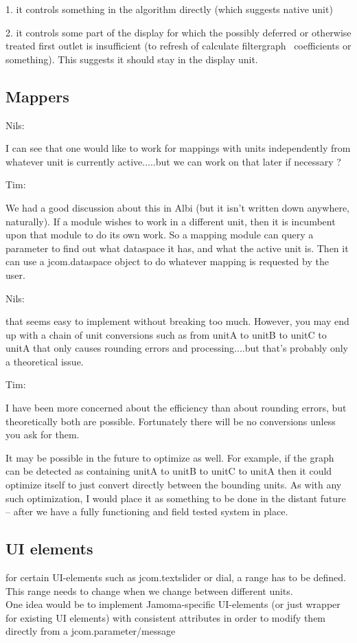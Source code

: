 \documentclass[]{article}
\begin{document}
 
1. it controls something in the algorithm directly (which suggests native unit)

 
2. it controls some part of the display for which the possibly deferred or otherwise treated first outlet is insufficient (to refresh of calculate filtergraph~ coefficients or something).  This suggests it should stay in the display unit.


\subsection{Mappers}

Nils:

I can see that one would like to work for mappings with units independently from whatever unit is currently active.....but we can work on that later if necessary ?

Tim:

We had a good discussion about this in Albi (but it isn't written down anywhere, naturally).  If a module wishes to work in a different unit, then it is incumbent upon that module to do its own work.  So a mapping module can query a parameter to find out what dataspace it has, and what the active unit is.  Then it can use a jcom.dataspace object to do whatever mapping is requested by the user.

Nils:

that seems easy to implement without breaking too much. However, you may end up with a chain of unit conversions such as from unitA to unitB to unitC to unitA that only causes rounding errors and processing....but that's probably only a theoretical issue.

Tim:

I have been more concerned about the efficiency than about rounding errors, but theoretically both are possible.  Fortunately there will be no conversions unless you ask for them.  

It may be possible in the future to optimize as well.  For example, if the graph can be detected as containing unitA to unitB to unitC to unitA then it could optimize itself to just convert directly between the bounding units.  As with any such optimization, I would place it as something to be done in the distant future -- after we have a fully functioning and field tested system in place.
 
\subsection{UI elements}
for certain UI-elements such as jcom.textslider or dial, a range has to be defined. This range needs to change when we change between different units.\\
One idea would be to implement Jamoma-specific UI-elements (or just wrapper for existing UI elements) with consistent attributes in order to modify them directly from a jcom.parameter/message                                                                                                                                               
\end{document}
